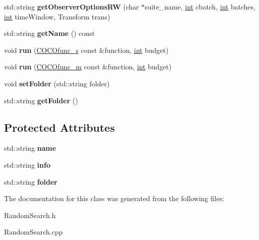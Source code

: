 \begin{DoxyCompactItemize}
\item 
std\+::string {\bfseries get\+Observer\+Options\+RW} (char $\ast$suite\+\_\+name, \hyperlink{classint}{int} cbatch, \hyperlink{classint}{int} batches, \hyperlink{classint}{int} time\+Window, Transform trans)\hypertarget{classCocoOptimiser_afc334f80b0aee491d2452f7f89402d17}{}\label{classCocoOptimiser_afc334f80b0aee491d2452f7f89402d17}

\item 
std\+::string {\bfseries get\+Name} () const \hypertarget{classCocoOptimiser_a265bd5d524ea5b10d5e9f4028cdc386c}{}\label{classCocoOptimiser_a265bd5d524ea5b10d5e9f4028cdc386c}

\item 
void {\bfseries run} (\hyperlink{classCOCOfunc__s}{C\+O\+C\+Ofunc\+\_\+s} const \&function, \hyperlink{classint}{int} budget)\hypertarget{classCocoOptimiser_a5842d02046cb097f0e11c84329f32799}{}\label{classCocoOptimiser_a5842d02046cb097f0e11c84329f32799}

\item 
void {\bfseries run} (\hyperlink{classCOCOfunc__m}{C\+O\+C\+Ofunc\+\_\+m} const \&function, \hyperlink{classint}{int} budget)\hypertarget{classCocoOptimiser_a1ad475649fa2f85129a8db7457cffeab}{}\label{classCocoOptimiser_a1ad475649fa2f85129a8db7457cffeab}

\item 
void {\bfseries set\+Folder} (std\+::string folder)\hypertarget{classCocoOptimiser_a2bfb5ff0b5420e95c6736070d4853eea}{}\label{classCocoOptimiser_a2bfb5ff0b5420e95c6736070d4853eea}

\item 
std\+::string {\bfseries get\+Folder} ()\hypertarget{classCocoOptimiser_aedb7b8bd6951c363b3ecbeb878cd0539}{}\label{classCocoOptimiser_aedb7b8bd6951c363b3ecbeb878cd0539}

\end{DoxyCompactItemize}
\subsection*{Protected Attributes}
\begin{DoxyCompactItemize}
\item 
std\+::string {\bfseries name}\hypertarget{classCocoOptimiser_a6832a1c556a6af0f47b0e1de31fc7488}{}\label{classCocoOptimiser_a6832a1c556a6af0f47b0e1de31fc7488}

\item 
std\+::string {\bfseries info}\hypertarget{classCocoOptimiser_a01d71a1cc52374efb3d9e0b4c80e44e7}{}\label{classCocoOptimiser_a01d71a1cc52374efb3d9e0b4c80e44e7}

\item 
std\+::string {\bfseries folder}\hypertarget{classCocoOptimiser_a92f48d32c1606ebee1f3d4d432553f4c}{}\label{classCocoOptimiser_a92f48d32c1606ebee1f3d4d432553f4c}

\end{DoxyCompactItemize}


The documentation for this class was generated from the following files\+:\begin{DoxyCompactItemize}
\item 
Random\+Search.\+h\item 
Random\+Search.\+cpp\end{DoxyCompactItemize}
